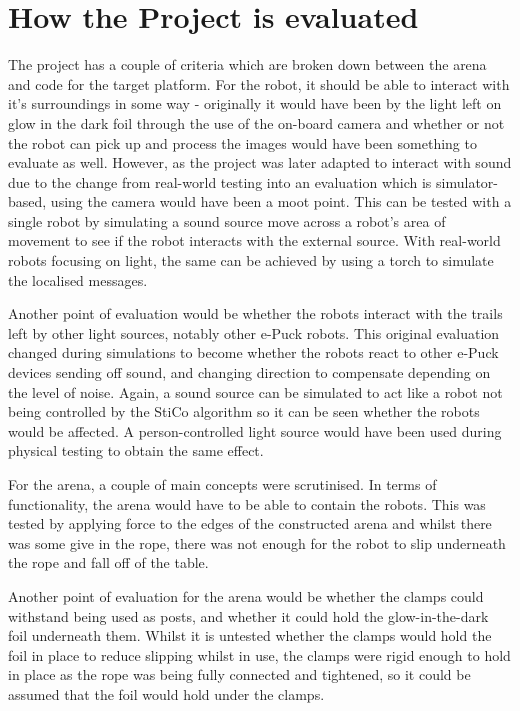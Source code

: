\section{How the Project is evaluated}
The project has a couple of criteria which are broken down between the arena
and code for the target platform.  For the robot, it should be able to
interact with it's surroundings in some way - originally it would have been by
the light left on glow in the dark foil through the use of the on-board camera
and whether or not the robot can pick up and process the images would have been
something to evaluate as well.  However, as the project was later adapted to
interact with sound due to the change from real-world testing into
an evaluation which is simulator-based, using the camera would have been a moot
point.  This can be tested with a single robot by simulating a sound source
move across a robot's area of movement to see if the robot interacts with the
external source.  With real-world robots focusing on light, the same can be
achieved by using a torch to simulate the localised messages.

Another point of evaluation would be whether the robots interact with the
trails left by other light sources, notably other e-Puck robots.  This original
evaluation changed during simulations to become whether the robots react to
other e-Puck devices sending off sound, and changing direction to compensate
depending on the level of noise.  Again, a sound source can be simulated to act
like a robot not being controlled by the StiCo algorithm so it can be seen
whether the robots would be affected.  A person-controlled light source would
have been used during physical testing to obtain the same effect.

For the arena, a couple of main concepts were scrutinised.  In terms of
functionality, the arena would have to be able to contain the robots.  This was
tested by applying force to the edges of the constructed arena and whilst there
was some give in the rope, there was not enough for the robot to slip
underneath the rope and fall off of the table.

Another point of evaluation for the arena would be whether the clamps could
withstand being used as posts, and whether it could hold the glow-in-the-dark
foil underneath them.  Whilst it is untested whether the clamps would hold the
foil in place to reduce slipping whilst in use, the clamps were rigid enough to
hold in place as the rope was being fully connected and tightened, so it could
be assumed that the foil would hold under the clamps.

